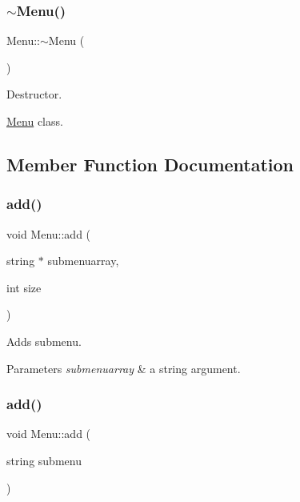 \subsubsection{\texorpdfstring{$\sim$\+Menu()}{~Menu()}}
{\footnotesize\ttfamily Menu\+::$\sim$\+Menu (\begin{DoxyParamCaption}{ }\end{DoxyParamCaption})}



Destructor. 

\hyperlink{classMenu}{Menu} class. 

\subsection{Member Function Documentation}
\mbox{\label{classMenu_a2be45a29dd0fa643d5fc118350bce944}} 
\subsubsection{\texorpdfstring{add()}{add()}\hspace{0.1cm}{\footnotesize\ttfamily [1/2]}}
{\footnotesize\ttfamily void Menu\+::add (\begin{DoxyParamCaption}\item[{string $\ast$}]{submenuarray,  }\item[{int}]{size }\end{DoxyParamCaption})}



Adds submenu. 


\begin{DoxyParams}{Parameters}
{\em submenuarray} & a string argument. \\
\hline
\end{DoxyParams}
\mbox{\label{classMenu_a5423c0d700c20bf8bdd0fb1dbf0c0f6f}} 
\subsubsection{\texorpdfstring{add()}{add()}\hspace{0.1cm}{\footnotesize\ttfamily [2/2]}}
{\footnotesize\ttfamily void Menu\+::add (\begin{DoxyParamCaption}\item[{string}]{submenu }\end{DoxyParamCaption})}



